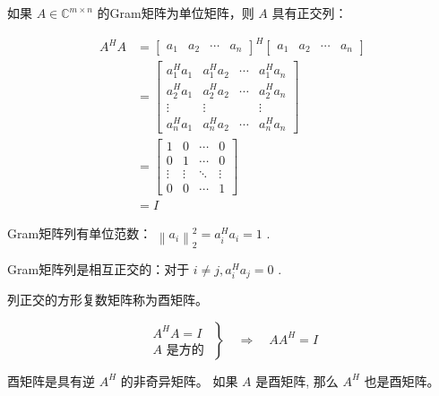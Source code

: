 \begin{definition}[复数域的Gram矩阵]
    如果 $ A \in \mathbb{C}^{m \times n} $ 的Gram矩阵为单位矩阵，则 $ A $ 具有正交列：

$$
\begin{aligned}
A^{H} A&=\left[\begin{array}{lllll}
a_{1} & a_{2} & \cdots & a_{n}
\end{array}\right]^{H}\left[\begin{array}{lccc}
a_{1} & a_{2} & \cdots & a_{n}
\end{array}\right] \\
&=\left[\begin{array}{cccc}
a_{1}^{H} a_{1} & a_{1}^{H} a_{2} & \cdots & a_{1}^{H} a_{n} \\
a_{2}^{H} a_{1} & a_{2}^{H} a_{2} & \cdots & a_{2}^{H} a_{n} \\
\vdots & \vdots & & \vdots \\
a_{n}^{H} a_{1} & a_{n}^{H} a_{2} & \cdots & a_{n}^{H} a_{n}
\end{array}\right] \\
&=\left[\begin{array}{cccc}
1 & 0 & \cdots & 0 \\
0 & 1 & \cdots & 0 \\
\vdots & \vdots & \ddots & \vdots \\
0 & 0 & \cdots & 1
\end{array}\right]
\\ &=I
\end{aligned}
$$
\end{definition}

Gram矩阵列有单位范数： $ \left\|a_{i}\right\|_{2}^{2}=a_{i}^{H} a_{i}=1 $ .

Gram矩阵列是相互正交的：对于 $ i \neq j, a_{i}^{H} a_{j}=0 $ .

\begin{definition}[酉矩阵]
    列正交的方形复数矩阵称为酉矩阵。
\end{definition}

\begin{definition}[酉矩阵的逆]
    $$ \left.\begin{array}{c}A^{H} A=I \\ A \text { 是方的 }\end{array}\right\} \quad \Rightarrow \quad A A^{H}=I $$
\end{definition}

酉矩阵是具有逆 $ A^{H} $ 的非奇异矩阵。 如果 $ A $ 是酉矩阵, 那么 $ A^{H} $ 也是酉矩阵。

